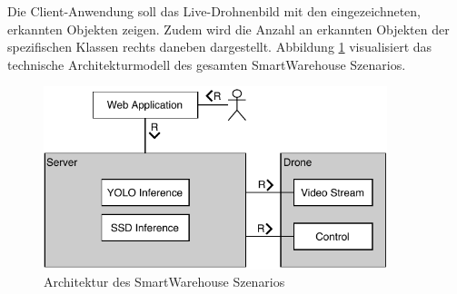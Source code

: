 Die Client-Anwendung soll das Live-Drohnenbild mit den eingezeichneten, erkannten Objekten zeigen. Zudem wird die Anzahl an erkannten Objekten der spezifischen Klassen rechts daneben dargestellt. Abbildung \ref{tam} visualisiert das technische Architekturmodell des gesamten SmartWarehouse Szenarios.

\begin{figure}[H]
	\begin{center}
		\includegraphics[width=10cm]{Bilder/tam.pdf}
		\caption[Architektur des SmartWarehouse Szenarios]{Architektur des SmartWarehouse Szenarios}
		\label{tam}
	\end{center}
\end{figure}